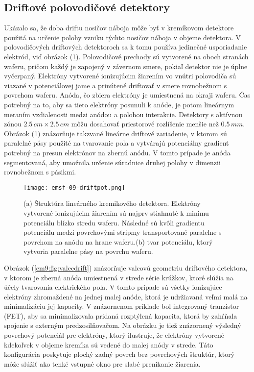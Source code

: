 \documentclass[../../main.tex]{subfiles}
\begin{document}
\subsection{Driftové polovodičové detektory}
Ukázalo sa, že doba driftu nosičov náboja môže byť v kremíkovom detektore použitá na určenie polohy vzniku týchto nosičov náboja v objeme detektora. V polovodičových driftových detektoroch sa k tomu používa jedinečné usporiadanie elektród, viď obrázok  
(\ref{em9:fig:drift}). Polovodičové prechody sú vytvorené na oboch stranách waferu, pričom každý je zapojený v závernom smere, pokiaľ detektor nie je úplne vyčerpaný. Elektróny vytvorené ionizujúcim žiarením vo vnútri polovodiča sú viazané v potenciálovej jame a prinútené driftovať v smere rovnobežnom s povrchom waferu. Anóda, čo zbiera elektróny je umiestnená na okraji waferu. Čas potrebný na to, aby sa tieto elektróny posunuli k anóde, je potom lineárnym meraním vzdialenosti medzi anódou a polohou interakcie. Detektory s aktívnou zónou $2.5\,\unit{cm} \times 2.5\,\unit{cm}$ môžu dosahovať priestorové rozlíšenie menšie než $0.5\,\unit{mm}$. Obrázok (\ref{em9:fig:drift}) znázorňuje takzvané lineárne driftové zariadenie, v ktorom sú paralelné pásy použité na tvarovanie poľa a vytvárajú potenciálny gradient potrebný na presun elektrónov na zbernú anódu. V tomto prípade je anóda segmentovaná, aby umožnila určenie súradnice druhej polohy v dimenzii rovnobežnom s pásikmi.

\begin{figure}[!h]
\texttt{[image: emsf-09-driftpot.png]}
\centering
\caption{(a) Štruktúra lineárného kremikového detektora. Elektróny vytvorené ionizujúcim žiarením sú najprv stiahnuté k minimu potenciálu blízko stredu waferu. Následné sú kvôli gradientu potenciálu medzi povrchovými stripmy transportované paralelne s povrchom na anódu na hrane waferu.(b) tvar potenciálu, ktorý vytvoria paralelne pásy na povrchu waferu.}
\label{em9:fig:drift}
\end{figure}

Obrázok (\ref{em9:fig:valecdrift}) znázorňuje valcovú geometriu driftového detektora, v ktorom je zberná anóda umiestnená v strede série krúžkov, ktoré slúžia na účely tvarovania elektrického poľa. V tomto prípade sú všetky ionizujúce elektróny zhromaždené na jednej malej anóde, ktorá je udržiavaná veľmi malá na minimalizáciu jej kapacity. V znázornenom príklade bol integrovaný tranzistor (FET), aby sa minimalizovala pridaná rozptýlená kapacita, ktorá by zahŕňala spojenie s externým predzosilňovačom. Na obrázku je tiež znázornený výsledný povrchový potenciál pre elektróny, ktorý ilustruje, že elektróny vytvorené kdekoľvek v objeme kremíka sú vedené do malej anódy v strede. Táto konfigurácia poskytuje plochý zadný povrch bez povrchových štruktúr, ktorý môže slúžiť ako tenké vstupné okno pre slabé prenikanie žiarenia.
\end{document}
